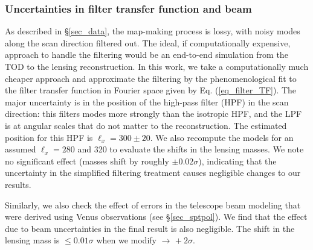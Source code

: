 \subsubsection{Uncertainties in filter transfer function and beam}\label{subsec_TF}
As described in \S\ref{sec_data}, the \sptpol{} map-making process is lossy, with noisy modes along the scan direction filtered out. 
The ideal, if computationally expensive, approach to handle the filtering would be an end-to-end simulation from the TOD to the lensing reconstruction. 
In this work, we take a computationally much cheaper approach and approximate the filtering by the phenomenological fit to the filter transfer function in Fourier space given by Eq. (\ref{eq_filter_TF}). 
The major uncertainty is in the position of the high-pass filter (HPF) in the scan direction: this filters modes more strongly than the isotropic HPF, and the LPF is at angular scales that do not matter to the reconstruction. 
The estimated position for this HPF is $\ell_x = 300 \pm 20$. 
We also recompute the models for an assumed $\ell_x = 280$ and 320 to evaluate the shifts in the lensing masses.
We note no significant effect (masses shift by roughly $\pm 0.02\sigma$), indicating that the uncertainty in the simplified filtering treatment causes negligible changes to our results.

Similarly, we also check the effect of errors in the telescope beam modeling \beambl{} that were derived using Venus observations (see \S\ref{sec_sptpol}). 
We find that the effect due to beam uncertainties in the final result is also negligible. 
The shift in the lensing mass is $\le 0.01\sigma$ when we modify \beambl{} $\rightarrow$ \beambl{} $+\ 2\sigma$.
